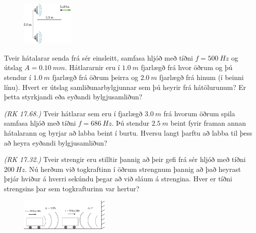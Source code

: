 \ifdefined \wholebook \else\documentclass[oneside]{book}\usepackage{EdlBook}\graphicspath{{figures/}}
\begin{document}
\begin{enumerate}[label = \textbf{Dæmi \thechapter.\arabic*.}]
\begin{minipage}{\linewidth}
\end{minipage}

\begin{minipage}{\linewidth}

\begin{figure}
\includegraphics[width = 1in]{figures/micron.pdf}
\end{figure}

\item Tveir hátalarar senda frá sér einsleitt, samfasa hljóð með tíðni $f = \SI{500}{Hz}$ og útslag $A = \SI{0.10}{mm}$. Hátlararnir eru í $\SI{1.0}{m}$ fjarlægð frá hvor öðrum og þú stendur í $\SI{1.0}{m}$ fjarlægð frá öðrum þeirra og $\SI{2.0}{m}$ fjarlægð frá hinum (í beinni línu). Hvert er útslag samliðunarbylgjunnar sem þú heyrir frá hátölurunum? Er þetta styrkjandi eða eyðandi bylgjusamliðun?

\item \textit{(RK 17.68.)} Tveir hátlarar sem eru í fjarlægð $\SI{3.0}{m}$ frá hvorum öðrum spila samfasa hljóð með tíðni $f = \SI{686}{Hz}$. Þú stendur $\SI{2.5}{m}$ beint fyrir framan annan hátalarann og byrjar að labba beint í burtu. Hversu langt þarftu að labba til þess að heyra eyðandi bylgjusamliðun?


\end{minipage}



\item \textit{(RK 17.32.)} Tveir strengir eru stilltir þannig að þeir gefi frá sér hljóð með tíðni $\SI{200}{Hz}$. Nú herðum við togkraftinn í öðrum strengnum þannig að það heyrast þrjár hviður á hverri sekúndu þegar að við sláum á strengina. Hver er tíðni strengsins þar sem togkrafturinn var hertur?

\begin{minipage}{\linewidth}

\begin{figure}
\vspace{-0.75cm}
\includegraphics[width = 1.7in]{figures/eftirfor-irodov.pdf}
\end{figure}


\end{minipage}
\end{enumerate}
\end{document}
